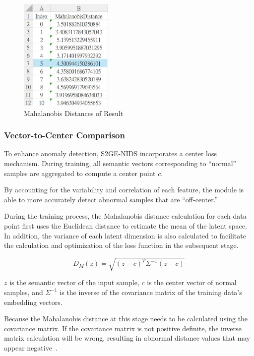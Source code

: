 \begin{ZhChapter}
    \begin{figure}[htbp]
        \centering
        \includegraphics[width = 0.4\textwidth]{image/mh_rs.jpg}
        \caption{Mahalanobis Distances of Result}
        \label{fig:mh_rs}
    \end{figure}



    \subsubsection{Vector-to-Center Comparison}
    To enhance anomaly detection, S2GE-NIDS incorporates a center loss mechanism. During training, all semantic vectors corresponding to ``normal'' samples are aggregated to compute a center point \(c\).



    By accounting for the variability and correlation of each feature, the module is able to more accurately detect abnormal samples that are ``off-center.''

    During the training process, the Mahalanobis distance calculation for each data point first uses the Euclidean distance to estimate the mean of the latent space. In addition, the variance of each latent dimension is also calculated to facilitate the calculation and optimization of the loss function in the subsequent stage.


    \begin{equation}
        D_M(z) = \sqrt{(z - c)^T \Sigma^{-1} (z - c)}
        \label{eq:mahalanobiseq}
    \end{equation}

    $z$ is the semantic vector of the input sample, $c$ is the center vector of normal samples, and $\Sigma^{-1}$ is the inverse of the covariance matrix of the training data's embedding vectors.

    Because the Mahalanobis distance at this stage needs to be calculated using the covariance matrix. If the covariance matrix is not positive definite, the inverse matrix calculation will be wrong, resulting in abnormal distance values that may appear negative~\cite{tolstikhin2021mlp}.


\end{ZhChapter}
